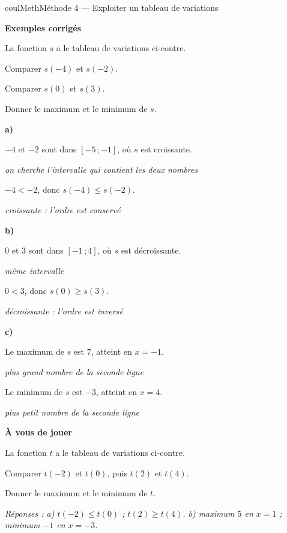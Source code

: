 \documentclass[11pt,a4paper]{article}
\makeatletter
\renewcommand{\le}{\leqslant}
\renewcommand{\ge}{\geqslant}
\newcommand{\lycee@intff}[2]{\left[#1\,;#2\right]}
\providecommand{\intff}{\lycee@intff}%
\newcounter{lycee@signet}
\newcommand{\signet}[3][]{\stepcounter{lycee@signet}%
  \edef\lycee@dest{\if\relax\detokenize{#1}\relax
    signet.\arabic{lycee@signet}\else#1\fi}%
  \hypertarget{\lycee@dest}{}\bookmark[level=#2,dest=\lycee@dest]{#3}}
\newcommand{\res}[1]{#1}
\newcounter{methode}
\newenvironment{methodebox}[1][Méthode]{\stepcounter{methode}%
  \begin{boitecours}[phantom={\signet[methode-\arabic{methode}]{2}{#1}}]{coulMeth}{#1}}%
  {\end{boitecours}}
\newcommand{\etape}[1]{\par\smallskip\textbf{\color{coulMeth}#1}\par\nobreak\smallskip}
\newcommand{\reponse}[1]{\par\smallskip
  {\footnotesize\itshape\color{black!55}Réponses : #1}}
\newcommand{\explique}[2]{\par\smallskip\noindent
  \begin{minipage}[t]{0.57\linewidth}\raggedright #1\end{minipage}\hfill
  \begin{minipage}[t]{0.40\linewidth}\raggedright\leavevmode
    {\small\itshape\color{black!60}#2}\end{minipage}\par}
\newcommand{\cas}[1]{\par\smallskip\noindent\textbf{\color{coulExo}#1}\vadjust{\nobreak}}
\newenvironment{correction}{\par}{\par}
\newcommand{\etapeexemples}{\etape{Exemples corrigés}}
\makeatother
\begin{document}
\begin{methodebox}[Méthode 4 --- Exploiter un tableau de variations]
\etapeexemples
\begin{minipage}[c]{0.5\linewidth}\raggedright
La fonction $s$ a le tableau de variations ci-contre.
\begin{questions}[label=\alph*)]
  \item Comparer $s(-4)$ et $s(-2)$.
  \item Comparer $s(0)$ et $s(3)$.
  \item Donner le maximum et le minimum de $s$.
\end{questions}
\end{minipage}\hfill
\begin{minipage}[c]{0.46\linewidth}\centering
{}
\end{minipage}
\begin{correction}
\cas{a)}
\explique{$-4$ et $-2$ sont dans $\intff{-5}{-1}$, où $s$ est croissante.}{on cherche
l'intervalle qui contient les deux nombres}
\explique{$-4<-2$, donc \res{$s(-4)\le s(-2)$}.}{croissante : l'ordre est conservé}
\cas{b)}
\explique{$0$ et $3$ sont dans $\intff{-1}{4}$, où $s$ est décroissante.}{même
intervalle}
\explique{$0<3$, donc \res{$s(0)\ge s(3)$}.}{décroissante : l'ordre est inversé}
\cas{c)}
\explique{Le maximum de $s$ est \res{$7$, atteint en $x=-1$}.}{plus grand nombre de la
seconde ligne}
\explique{Le minimum de $s$ est \res{$-3$, atteint en $x=4$}.}{plus petit nombre de la
seconde ligne}
\end{correction}

\etape{À vous de jouer}
\begin{minipage}[c]{0.5\linewidth}\raggedright
La fonction $t$ a le tableau de variations ci-contre.
\begin{questions}[label=\alph*)]
  \item Comparer $t(-2)$ et $t(0)$, puis $t(2)$ et $t(4)$.
  \item Donner le maximum et le minimum de $t$.
\end{questions}
\reponse{a) $t(-2)\le t(0)$ ; $t(2)\ge t(4)$. b) maximum $5$ en $x=1$ ; minimum $-1$
en $x=-3$.}
\end{minipage}\hfill
\begin{minipage}[c]{0.46\linewidth}\centering
{}
\end{minipage}
\end{methodebox}
\end{document}
